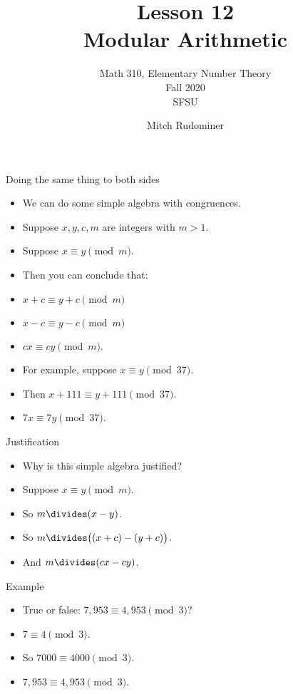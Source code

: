 \documentclass[handout]{beamer}
\title{Lesson 12 \\ Modular Arithmetic}
\subtitle{Math 310, Elementary Number Theory \\ Fall 2020 \\ SFSU}
\author{Mitch Rudominer}
\date{}
\begin{document}
\begin{frame}
  \titlepage
\end{frame}

\begin{frame}{Doing the same thing to both sides}

\begin{itemize}
  \item We can do some simple algebra with congruences.
  \item Suppose $x,y,c,m$ are integers with $m>1$.
  \item Suppose $x\equiv y \pmod m$.
  \item Then you can conclude that:
  \item $x+c\equiv y+c \pmod m$
  \item $x-c\equiv y-c \pmod m$
  \item $cx \equiv cy \pmod m$.
  \item For example, suppose $x\equiv y \pmod {37}$.
  \item Then $x+111\equiv y+111 \pmod {37}$.
  \item $7x \equiv 7y \pmod {37}$.
\end{itemize}

\end{frame}

\begin{frame}{Justification}

\begin{itemize}
  \item Why is this simple algebra justified?
  \item Suppose $x\equiv y \pmod m$.
  \item So $m \divides (x-y)$.
  \item So $m \divides \big( (x+c) - (y+c) \big)$.
  \item And $m \divides (cx - cy)$.
\end{itemize}

\end{frame}

\begin{frame}{Example}

\begin{itemize}
  \item True or false: $7,953 \equiv  4,953 \pmod 3$?
  \item $7\equiv 4  \pmod 3$.
  \item So $7000 \equiv 4000 \pmod 3$.
  \item $7,953 \equiv  4,953 \pmod 3$.
\end{itemize}

\end{frame}
\end{document}
